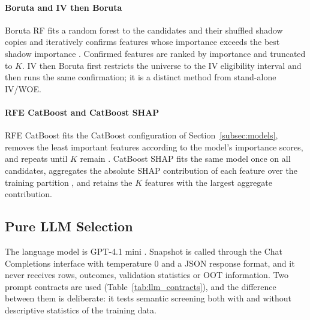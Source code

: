 \documentclass[preprint,12pt]{elsarticle}
\newcommand{\Kfeat}{K}
\begin{document}
\paragraph{Boruta and IV then Boruta}
Boruta RF fits a random forest to the candidates and their shuffled shadow copies and iteratively confirms features whose importance exceeds the best shadow importance \cite{kursa2010,breiman2001}. Confirmed features are ranked by importance and truncated to $\Kfeat$. IV then Boruta first restricts the universe to the IV eligibility interval and then runs the same confirmation; it is a distinct method from stand-alone IV/WOE.

\paragraph{RFE CatBoost and CatBoost SHAP}
RFE CatBoost fits the CatBoost configuration of Section~\ref{subsec:models}, removes the least important features according to the model's importance scores, and repeats until $\Kfeat$ remain \cite{guyon2002}. CatBoost SHAP fits the same model once on all candidates, aggregates the absolute SHAP contribution of each feature over the training partition \cite{lundberg2017}, and retains the $\Kfeat$ features with the largest aggregate contribution.

\subsection{Pure LLM Selection}
\label{subsec:llm_fs}

The language model is GPT-4.1 mini \cite{openai2025gpt41}. Snapshot  is called through the Chat Completions interface with temperature 0 and a JSON response format, and it never receives rows, outcomes, validation statistics or OOT information. Two prompt contracts are used (Table~\ref{tab:llm_contracts}), and the difference between them is deliberate: it tests semantic screening both with and without descriptive statistics of the training data.
\end{document}

